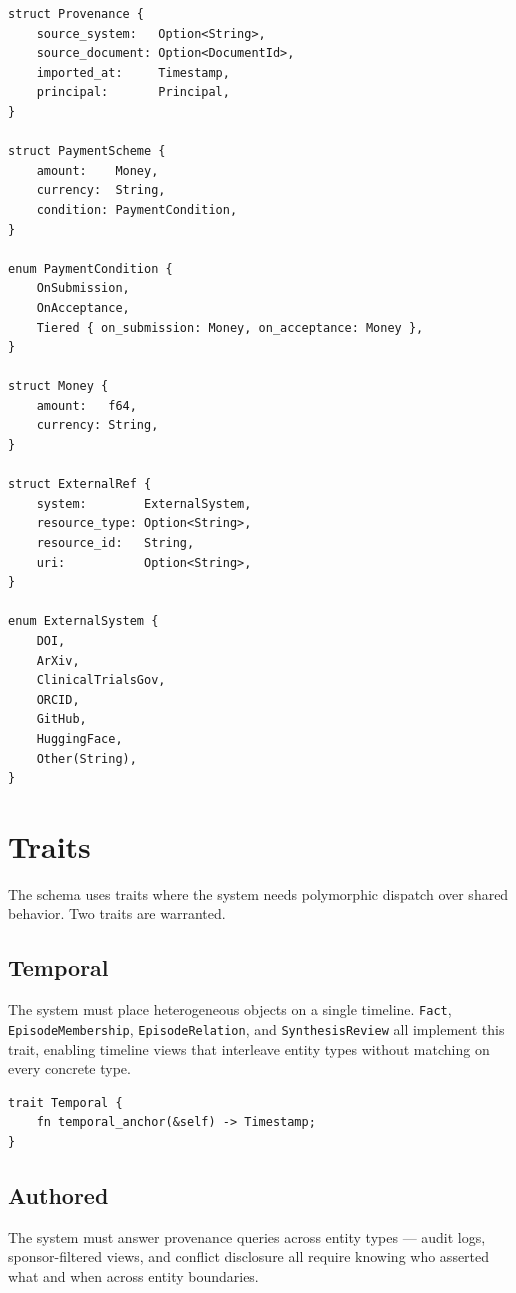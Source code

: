 \documentclass[11pt]{article}
\begin{document}
\begin{lstlisting}
struct Provenance {
    source_system:   Option<String>,
    source_document: Option<DocumentId>,
    imported_at:     Timestamp,
    principal:       Principal,
}

struct PaymentScheme {
    amount:    Money,
    currency:  String,
    condition: PaymentCondition,
}

enum PaymentCondition {
    OnSubmission,
    OnAcceptance,
    Tiered { on_submission: Money, on_acceptance: Money },
}

struct Money {
    amount:   f64,
    currency: String,
}

struct ExternalRef {
    system:        ExternalSystem,
    resource_type: Option<String>,
    resource_id:   String,
    uri:           Option<String>,
}

enum ExternalSystem {
    DOI,
    ArXiv,
    ClinicalTrialsGov,
    ORCID,
    GitHub,
    HuggingFace,
    Other(String),
}
\end{lstlisting}

\section{Traits}

The schema uses traits where the system needs polymorphic dispatch over shared
behavior. Two traits are warranted.

\subsection{Temporal}

The system must place heterogeneous objects on a single timeline.
\texttt{Fact}, \texttt{EpisodeMembership}, \texttt{EpisodeRelation}, and
\texttt{SynthesisReview} all implement this trait, enabling timeline views that
interleave entity types without matching on every concrete type.

\begin{lstlisting}
trait Temporal {
    fn temporal_anchor(&self) -> Timestamp;
}
\end{lstlisting}

\subsection{Authored}

The system must answer provenance queries across entity types --- audit logs,
sponsor-filtered views, and conflict disclosure all require knowing who
asserted what and when across entity boundaries.
\end{document}
